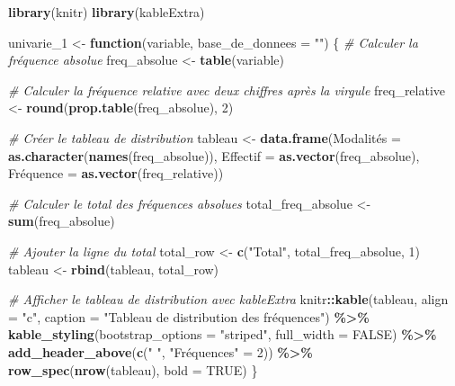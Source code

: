 \documentclass[
]{article}
\newenvironment{Shaded}{\begin{snugshade}}{\end{snugshade}}
\newcommand{\AttributeTok}[1]{\textcolor[rgb]{0.13,0.29,0.53}{#1}}
\newcommand{\CommentTok}[1]{\textcolor[rgb]{0.56,0.35,0.01}{\textit{#1}}}
\newcommand{\ConstantTok}[1]{\textcolor[rgb]{0.56,0.35,0.01}{#1}}
\newcommand{\ControlFlowTok}[1]{\textcolor[rgb]{0.13,0.29,0.53}{\textbf{#1}}}
\newcommand{\DecValTok}[1]{\textcolor[rgb]{0.00,0.00,0.81}{#1}}
\newcommand{\FunctionTok}[1]{\textcolor[rgb]{0.13,0.29,0.53}{\textbf{#1}}}
\newcommand{\NormalTok}[1]{#1}
\newcommand{\OtherTok}[1]{\textcolor[rgb]{0.56,0.35,0.01}{#1}}
\newcommand{\SpecialCharTok}[1]{\textcolor[rgb]{0.81,0.36,0.00}{\textbf{#1}}}
\newcommand{\StringTok}[1]{\textcolor[rgb]{0.31,0.60,0.02}{#1}}
\begin{document}
\begin{Shaded}
\begin{Highlighting}[]
\FunctionTok{library}\NormalTok{(knitr)}
\FunctionTok{library}\NormalTok{(kableExtra)}

\NormalTok{univarie\_1 }\OtherTok{\textless{}{-}} \ControlFlowTok{function}\NormalTok{(variable, }\AttributeTok{base\_de\_donnees =} \StringTok{""}\NormalTok{) \{}
  \CommentTok{\# Calculer la fréquence absolue}
\NormalTok{  freq\_absolue }\OtherTok{\textless{}{-}} \FunctionTok{table}\NormalTok{(variable)}
  
  \CommentTok{\# Calculer la fréquence relative avec deux chiffres après la virgule}
\NormalTok{  freq\_relative }\OtherTok{\textless{}{-}} \FunctionTok{round}\NormalTok{(}\FunctionTok{prop.table}\NormalTok{(freq\_absolue), }\DecValTok{2}\NormalTok{)}
  
  \CommentTok{\# Créer le tableau de distribution}
\NormalTok{  tableau }\OtherTok{\textless{}{-}} \FunctionTok{data.frame}\NormalTok{(Modalités }\OtherTok{=} \FunctionTok{as.character}\NormalTok{(}\FunctionTok{names}\NormalTok{(freq\_absolue)),}
                        \AttributeTok{Effectif =} \FunctionTok{as.vector}\NormalTok{(freq\_absolue),}
\NormalTok{                        Fréquence }\OtherTok{=} \FunctionTok{as.vector}\NormalTok{(freq\_relative))}
  
  \CommentTok{\# Calculer le total des fréquences absolues}
\NormalTok{  total\_freq\_absolue }\OtherTok{\textless{}{-}} \FunctionTok{sum}\NormalTok{(freq\_absolue)}
  
  \CommentTok{\# Ajouter la ligne du total}
\NormalTok{  total\_row }\OtherTok{\textless{}{-}} \FunctionTok{c}\NormalTok{(}\StringTok{"Total"}\NormalTok{, total\_freq\_absolue, }\DecValTok{1}\NormalTok{)}
\NormalTok{  tableau }\OtherTok{\textless{}{-}} \FunctionTok{rbind}\NormalTok{(tableau, total\_row)}
  
  \CommentTok{\# Afficher le tableau de distribution avec kableExtra}
\NormalTok{  knitr}\SpecialCharTok{::}\FunctionTok{kable}\NormalTok{(tableau, }\AttributeTok{align =} \StringTok{"c"}\NormalTok{, }\AttributeTok{caption =} \StringTok{"Tableau de distribution des fréquences"}\NormalTok{) }\SpecialCharTok{\%\textgreater{}\%}
    \FunctionTok{kable\_styling}\NormalTok{(}\AttributeTok{bootstrap\_options =} \StringTok{"striped"}\NormalTok{, }\AttributeTok{full\_width =} \ConstantTok{FALSE}\NormalTok{) }\SpecialCharTok{\%\textgreater{}\%}
    \FunctionTok{add\_header\_above}\NormalTok{(}\FunctionTok{c}\NormalTok{(}\StringTok{" "}\NormalTok{, }\StringTok{"Fréquences"} \OtherTok{=} \DecValTok{2}\NormalTok{)) }\SpecialCharTok{\%\textgreater{}\%}
    \FunctionTok{row\_spec}\NormalTok{(}\FunctionTok{nrow}\NormalTok{(tableau), }\AttributeTok{bold =} \ConstantTok{TRUE}\NormalTok{)}
\NormalTok{\}}
\end{Highlighting}
\end{Shaded}
\end{document}
